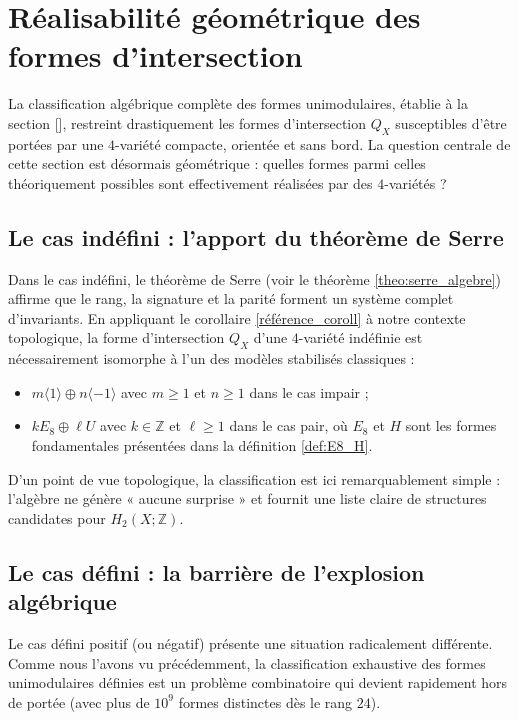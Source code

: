 \section{Réalisabilité géométrique des formes d'intersection}

La classification algébrique complète des formes unimodulaires, établie à la section [], restreint drastiquement les formes d'intersection $Q_X$ susceptibles d'être portées par une $4$-variété compacte, orientée et sans bord. La question centrale de cette section est désormais géométrique : quelles formes parmi celles théoriquement possibles sont effectivement réalisées par des $4$-variétés ?

\subsection{Le cas indéfini : l'apport du théorème de Serre}

Dans le cas indéfini, le théorème de Serre (voir le théorème \ref{theo:serre_algebre}) affirme que le rang, la signature et la parité forment un système complet d'invariants. En appliquant le corollaire \ref{référence_coroll} à notre contexte topologique, la forme d'intersection $Q_X$ d'une $4$-variété indéfinie est nécessairement isomorphe à l'un des modèles stabilisés classiques :
\begin{itemize}
    \item $m\langle 1 \rangle \oplus n\langle -1 \rangle$ avec $m \geq 1$ et $n \geq 1$ dans le cas impair ;
    \item $kE_8 \oplus \ell U$ avec $k \in \mathbb{Z}$ et $\ell \geq 1$ dans le cas pair, où $E_8$ et $H$ sont les formes fondamentales présentées dans la définition \ref{def:E8_H}.
\end{itemize}

D'un point de vue topologique, la classification est ici remarquablement simple : l'algèbre ne génère « aucune surprise » et fournit une liste claire de structures candidates pour $H_2(X;\mathbb{Z})$.

\subsection{Le cas défini : la barrière de l'explosion algébrique}

Le cas défini positif (ou négatif) présente une situation radicalement différente. Comme nous l'avons vu précédemment, la classification exhaustive des formes unimodulaires définies est un problème combinatoire qui devient rapidement hors de portée (avec plus de $10^9$ formes distinctes dès le rang $24$). 

